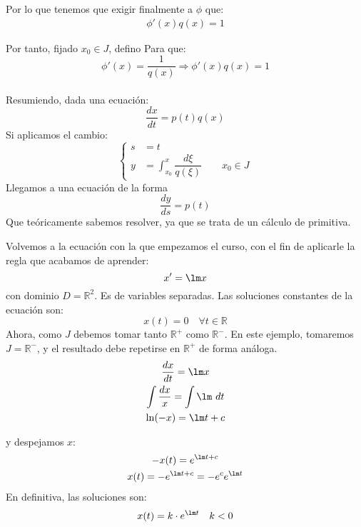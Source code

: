 Por lo que tenemos que exigir finalmente a $\phi$ que:
\begin{gather*}
    \phi'(x) q(x) = 1
\end{gather*}

Por tanto, fijado $x_0\in J$, defino
Para que:
\begin{equation*}
    \phi'(x) = \dfrac{1}{q(x)} \Longrightarrow \phi'(x)q(x) = 1
\end{equation*}~\\
Resumiendo, dada una ecuación:
\begin{equation*}
    \dfrac{dx}{dt} = p(t)q(x)
\end{equation*}
Si aplicamos el cambio:
\begin{equation*}
    \left\{\begin{array}{rl}
            s &= t  \\
            y &= \displaystyle\int_{x_0}^{x} \dfrac{d\xi}{q(\xi)} \qquad x_0\in J
    \end{array}\right.
\end{equation*}
Llegamos a una ecuación de la forma
\begin{equation*}
    \dfrac{dy}{ds} = p(t)
\end{equation*}
Que teóricamente sabemos resolver, ya que se trata de un cálculo de primitiva.

\begin{ejemplo}
    Volvemos a la ecuación con la que empezamos el curso, con el fin de aplicarle la regla que acabamos de aprender:
    \begin{equation*}
        x' = \lm x
    \end{equation*}
    con dominio $D=\mathbb{R}^2$. Es de variables separadas. Las soluciones constantes de la ecuación son:
    \begin{equation*}
        x(t) = 0 \quad \forall t\in \mathbb{R}
    \end{equation*}
    Ahora, como $J$ debemos tomar tanto $\mathbb{R}^+$ como $\mathbb{R}^-$. En este ejemplo, tomaremos $J=\mathbb{R}^-$, y el resultado debe repetirse en $\mathbb{R}^+$ de forma análoga.
    \begin{gather*}
        \dfrac{dx}{dt} = \lm x \\
        \int \dfrac{dx}{x} = \int \lm~dt  \\
        \ln(-x) = \lm t + c
    \end{gather*}

    y despejamos $x$:
    \begin{gather*}
        -x(t) = e^{\lm t + c} \\
        x(t) = -e^{\lm t + c} = -e^c e^{\lm t}
    \end{gather*}
    En definitiva, las soluciones son:
    \begin{equation*}
        x(t) = k\cdot e^{\lm t} \quad k<0
    \end{equation*}
\end{ejemplo}

